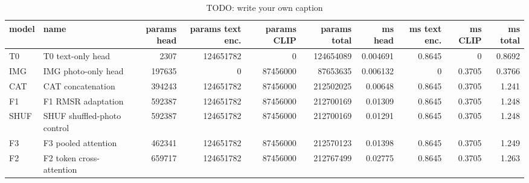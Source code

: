 \begin{table}
\caption{TODO: write your own caption}\label{tab:T17-amazon-params-latency}
\scriptsize
\begin{tabularx}{\textheight}{l>{\raggedright\arraybackslash}Xrrrrrrrr}
\toprule
model & name & params head & params text enc. & params CLIP & params total & ms head & ms text enc. & ms CLIP & ms total \\
\midrule
T0 & T0 text-only head & 2307 & 124651782 & 0 & 124654089 & 0.004691 & 0.8645 & 0 & 0.8692 \\
IMG & IMG photo-only head & 197635 & 0 & 87456000 & 87653635 & 0.006132 & 0 & 0.3705 & 0.3766 \\
CAT & CAT concatenation & 394243 & 124651782 & 87456000 & 212502025 & 0.00648 & 0.8645 & 0.3705 & 1.241 \\
F1 & F1 RMSR adaptation & 592387 & 124651782 & 87456000 & 212700169 & 0.01309 & 0.8645 & 0.3705 & 1.248 \\
SHUF & SHUF shuffled-photo control & 592387 & 124651782 & 87456000 & 212700169 & 0.01291 & 0.8645 & 0.3705 & 1.248 \\
F3 & F3 pooled attention & 462341 & 124651782 & 87456000 & 212570123 & 0.01398 & 0.8645 & 0.3705 & 1.249 \\
F2 & F2 token cross-attention & 659717 & 124651782 & 87456000 & 212767499 & 0.02775 & 0.8645 & 0.3705 & 1.263 \\
\bottomrule
\end{tabularx}
\par{}
\end{table}
